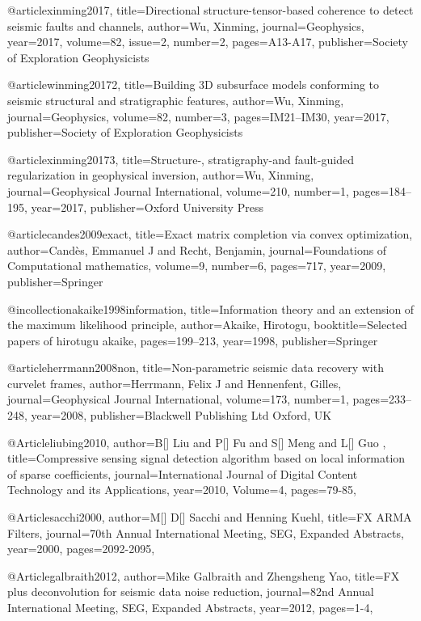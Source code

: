 {@article{xinming2017,
  title={Directional structure-tensor-based coherence to detect seismic faults and channels},
  author={Wu, Xinming},
  journal={Geophysics},
  year={2017},
  volume=82,
  issue=2,
  number=2,
  pages={A13-A17},
  publisher={Society of Exploration Geophysicists}
}

@article{winming20172,
  title={Building 3D subsurface models conforming to seismic structural and stratigraphic features},
  author={Wu, Xinming},
  journal={Geophysics},
  volume={82},
  number={3},
  pages={IM21--IM30},
  year={2017},
  publisher={Society of Exploration Geophysicists}
}

@article{xinming20173,
  title={Structure-, stratigraphy-and fault-guided regularization in geophysical inversion},
  author={Wu, Xinming},
  journal={Geophysical Journal International},
  volume={210},
  number={1},
  pages={184--195},
  year={2017},
  publisher={Oxford University Press}
}

@article{candes2009exact,
  title={Exact matrix completion via convex optimization},
  author={Cand{\`e}s, Emmanuel J and Recht, Benjamin},
  journal={Foundations of Computational mathematics},
  volume={9},
  number={6},
  pages={717},
  year={2009},
  publisher={Springer}
}

@incollection{akaike1998information,
  title={Information theory and an extension of the maximum likelihood principle},
  author={Akaike, Hirotogu},
  booktitle={Selected papers of hirotugu akaike},
  pages={199--213},
  year={1998},
  publisher={Springer}
}

@article{herrmann2008non,
  title={Non-parametric seismic data recovery with curvelet frames},
  author={Herrmann, Felix J and Hennenfent, Gilles},
  journal={Geophysical Journal International},
  volume={173},
  number={1},
  pages={233--248},
  year={2008},
  publisher={Blackwell Publishing Ltd Oxford, UK}
}

@Article{liubing2010,
  author={B[] Liu and P[] Fu and S[] Meng and L[] Guo },
  title={Compressive sensing signal detection algorithm based on local information of sparse coefficients},
  journal={International Journal of Digital Content Technology and its Applications},
  year=2010,
  Volume=4,
  pages={79-85},
}


@Article{sacchi2000,
  author={M[] D[] Sacchi and Henning Kuehl},
  title={FX ARMA Filters},
  journal={70th Annual International Meeting, SEG, Expanded Abstracts},
  year=2000,
  pages={2092-2095},
}

@Article{galbraith2012,
  author={Mike Galbraith and Zhengsheng Yao},
  title={FX plus deconvolution for seismic data noise reduction},
  journal={82nd Annual International Meeting, SEG, Expanded Abstracts},
  year=2012,
  pages={1-4},
}

}
